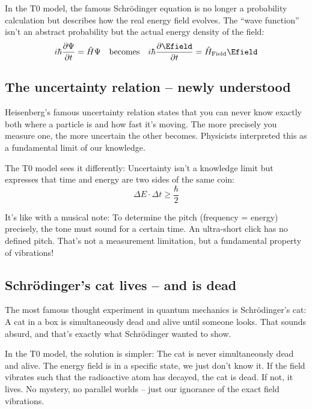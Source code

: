 	\begin{tcolorbox}
		In the T0 model, the famous Schrödinger equation is no longer a probability calculation but describes how the real energy field evolves. The ``wave function'' isn't an abstract probability but the actual energy density of the field:
		\begin{equation}
			i\hbar \frac{\partial \Psi}{\partial t} = \hat{H}\Psi \quad \text{becomes} \quad i\hbar \frac{\partial \Efield}{\partial t} = \hat{H}_{\text{Field}}\Efield
		\end{equation}
	\end{tcolorbox}
	
	\subsection{The uncertainty relation -- newly understood}
	
	Heisenberg's famous uncertainty relation states that you can never know exactly both where a particle is and how fast it's moving. The more precisely you measure one, the more uncertain the other becomes. Physicists interpreted this as a fundamental limit of our knowledge.
	
	The T0 model sees it differently: Uncertainty isn't a knowledge limit but expresses that time and energy are two sides of the same coin:
	\begin{equation}
		\Delta E \cdot \Delta t \geq \frac{\hbar}{2}
	\end{equation}
	
	It's like with a musical note: To determine the pitch (frequency = energy) precisely, the tone must sound for a certain time. An ultra-short click has no defined pitch. That's not a measurement limitation, but a fundamental property of vibrations!
	
	\subsection{Schrödinger's cat lives -- and is dead}
	
	The most famous thought experiment in quantum mechanics is Schrödinger's cat: A cat in a box is simultaneously dead and alive until someone looks. That sounds absurd, and that's exactly what Schrödinger wanted to show.
	
	In the T0 model, the solution is simpler: The cat is never simultaneously dead and alive. The energy field is in a specific state, we just don't know it. If the field vibrates such that the radioactive atom has decayed, the cat is dead. If not, it lives. No mystery, no parallel worlds -- just our ignorance of the exact field vibrations.
	
